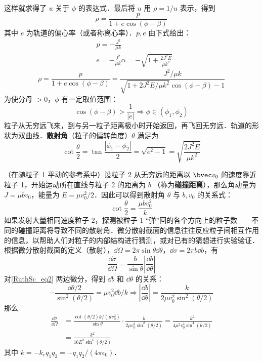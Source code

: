 这样就求得了 $u$ 关于 $\phi$ 的表达式．最后将 $u$ 用 $\rho=1/u$ 表示，得到
\begin{equation}
\rho=\frac{p}{1+e\cos(\phi-\beta)}
\end{equation}
其中 $e$ 为轨道的偏心率（或者称离心率）．$p,e$ 由下式给出：
\begin{equation}
\begin{aligned}
&p=-\frac{J^2}{\mu k}\\
&e=-\frac{J^2}{\mu k}\alpha=-\sqrt{1+\frac{2J^2E}{\mu k^2}}
\end{aligned}
\end{equation}
\begin{equation}
\rho=\frac{p}{1+e\cos(\phi-\beta)}=\frac{J^2/\mu k}{\sqrt{1+2J^2E/\mu k^2}\cos(\phi-\beta)-1}
\end{equation}
为使分母 $>0$，$\phi$ 有一定取值范围：
\begin{equation}
\cos(\phi-\beta)>\frac{1}{|e|}
\Rightarrow \phi \in (\phi_1,\phi_2)
\end{equation}
粒子从无穷远飞来，到与另一粒子距离极小时开始返回，再飞回无穷远．轨道的形状为双曲线．\textbf{散射角}（粒子的偏转角度）$\theta$ 满足为
\begin{equation}
\cot\frac{\theta}{2}=\tan\frac{|\phi_1-\phi_2|}{2} =\sqrt{e^2-1}=\sqrt{\frac{2J^2E}{\mu k^2}}
\end{equation}

（在随粒子 1 平动的参考系中）设粒子 2 从无穷远的距离以 $\bvec v_0$ 的速度靠近粒子 1，开始运动所在直线与粒子 2 的距离为 $b$ （称为\textbf{碰撞距离}），那么角动量为 $J=\mu bv_0$，能量为 $E=\mu v_0^2/2$．因此可以得到散射角 $\theta$ 与 $b,v_0$ 的关系式：
\begin{equation}\label{RuthSc_eq2}
\cot \frac{\theta}{2}=\frac{\mu bv_0^2}{k}
\end{equation}
如果发射大量相同速度粒子 2，探测被粒子 1 “弹”回的各个方向上的粒子数——不同的碰撞距离将导致不同的散射角．微分散射截面的信息往往反应粒子间相互作用的信息，以帮助人们对粒子的内部结构进行猜测，或对已有的猜想进行实验验证．根据微分散射截面的定义（散射），$\dd \Omega=2\pi \sin\theta \dd \theta$，$\dd \sigma=2\pi b\dd b$，有
\begin{equation}
\frac{\dd \sigma}{\dd \Omega}=\frac{b}{\sin \theta}\left|\frac{\dd b}{\dd \theta}\right|
\end{equation}
对\autoref{RuthSc_eq2} 两边微分，得到 $\dd b$ 和 $\dd \theta$ 的关系：
\begin{equation}
-\frac{\dd \theta/2}{\sin^2(\theta/2)}=\mu v_0^2\dd b/k\Rightarrow \left|\frac{\dd b}{\dd \theta}\right|=\frac{k}{2\mu v_0^2\sin^2(\theta/2)}
\end{equation}
那么
\begin{equation}
\begin{aligned}
\frac{\dd \sigma}{\dd \Omega}&=\frac{\cot(\theta/2)k/(\mu v_0^2)}{\sin\theta}\cdot \frac{k}{2\mu v_0^2\sin^2(\theta/2)}=\frac{k^2}{4\mu ^2v_0^4\sin^4(\theta/2)}
\\
&=\frac{k^2}{16E^2\sin^4(\theta/2)}
\end{aligned}
\end{equation}
其中 $k=-k_eq_1q_2=-q_1q_2/(4\pi\epsilon_0)$．

